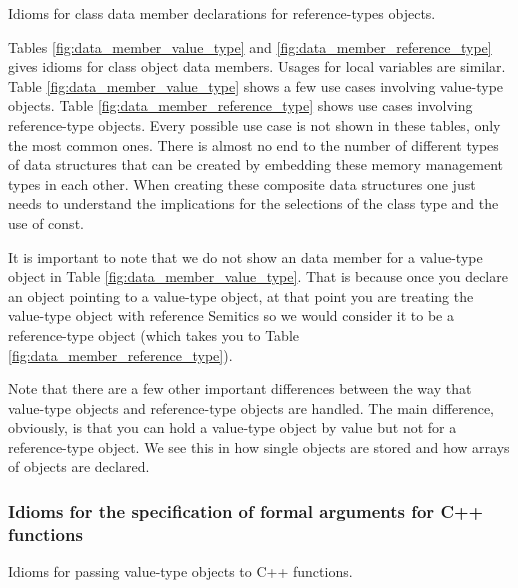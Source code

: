 \documentclass[pdf,ps2pdf,11pt]{SANDreport}
\begin{document}
\begin{table}
%
\begin{center}
%
%

%
%
\end{center}
\caption{\label{fig:data_member_reference_type}
Idioms for class data member declarations for reference-types
objects.}
%
\end{table}


Tables {}\ref{fig:data_member_value_type} and
{}\ref{fig:data_member_reference_type} gives idioms for class object
data members.  Usages for local variables are similar.  Table
{}\ref{fig:data_member_value_type} shows a few use cases involving
value-type objects.  Table {}\ref{fig:data_member_reference_type}
shows use cases involving reference-type objects.  Every possible use
case is not shown in these tables, only the most common ones.  There
is almost no end to the number of different types of data structures
that can be created by embedding these memory management types in each
other.  When creating these composite data structures one just needs
to understand the implications for the selections of the class type
and the use of const.

It is important to note that we do not show an {} data
member for a value-type object in Table
{}\ref{fig:data_member_value_type}.  That is because once you declare
an {} object pointing to a value-type object, at that
point you are treating the value-type object with reference Semitics
so we would consider it to be a reference-type object (which takes you
to Table {}\ref{fig:data_member_reference_type}).

Note that there are a few other important differences between the way
that value-type objects and reference-type objects are handled.  The
main difference, obviously, is that you can hold a value-type object
by value but not for a reference-type object.  We see this in how
single objects are stored and how arrays of objects are declared.


%
{}\subsubsection{Idioms for the specification of formal arguments for
C++ functions}
\label{sec:idioms-for-passing-arguments}
%

\begin{table}[p]
%
\begin{center}
%
%

%
%
%
\end{center}
\caption{\label{fig:func_args_value_type}
Idioms for passing value-type objects to C++ functions.}
%
\end{table}
\end{document}
